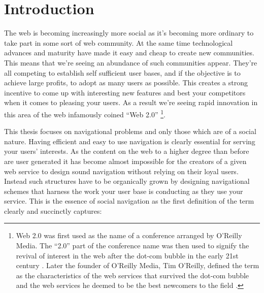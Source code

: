 \chapter{Introduction}

%
%

The web is becoming increasingly more social as it's becoming more ordinary to
take part in some sort of web community. At the same time technological
advances and maturity have made it easy and cheap to create new communities.
This means that we're seeing an abundance of such communities appear.
They're all competing to establish self sufficient user bases, and if the
objective is to achieve large profits, to adopt as many users
as possible. This creates a strong incentive to come up with interesting new
features and best your competitors when it comes to pleasing your users.
As a result we're seeing rapid innovation in this area of the web infamously
coined ``Web 2.0''
\footnote{Web 2.0 was first used as the name of a conference arranged by
O'Reilly Media. The ``2.0'' part of the conference name was then used to
signify the revival of interest in the web after the dot-com bubble in the
early 21st century \citep{oreilly07}.
Later the founder of O'Reilly Media, Tim O'Reilly, defined
the term as the characteristics of the web services that survived the dot-com
bubble and the web services he deemed to be the best newcomers to the
field \citep{oreilly05}.}.

This thesis focuses on navigational problems and only those which are of a
social nature. Having efficient and easy to use navigation is clearly
essential for serving your users' interests. As the content on the web to a
higher degree than before are user generated it has become almost impossible
for the creators of a given web service to design sound navigation without
relying on their loyal users. Instead such structures have to be organically
grown by designing navigational schemes that harness the work your user base
is conducting as they use your service. This is the essence of social
navigation as the first definition of the term clearly and succinctly
captures:

